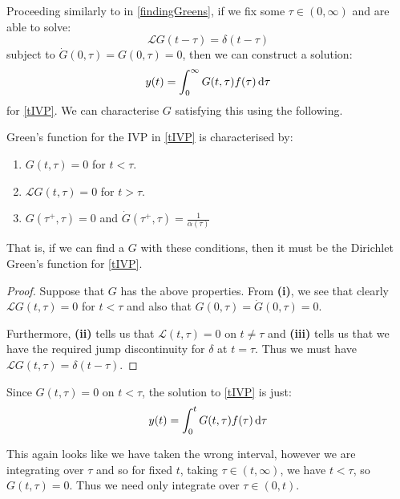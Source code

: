 \documentclass[../main.tex]{subfiles}
\begin{document}
Proceeding similarly to in \cref{findingGreens}, if we fix some $\tau \in (0, \infty)$ and are able to solve:
\[
  \mathcal{L}G(t - \tau) = \delta(t - \tau)
\]
subject to $\dot{G}(0, \tau) = G(0, \tau) = 0$, then we can construct a solution:
\[
  y(t) = \int_{0}^{\infty} G(t, \tau) f(\tau) \d{\tau}
\]
for \cref{tIVP}.
We can characterise $G$ satisfying this using the following.
\begin{proposition}
  Green's function for the IVP in \cref{tIVP} is characterised by:
  \begin{enumerate}
    \item $G(t, \tau) = 0$ for $t < \tau$.
    \item $\mathcal{L}G(t, \tau) = 0$ for $t > \tau$.
    \item $G(\tau^{+}, \tau) = 0$ and $\dot{G}(\tau^{+}, \tau) = \frac{1}{\alpha(\tau)}$
  \end{enumerate}
  That is, if we can find a $G$ with these conditions, then it must be the Dirichlet Green's function for \cref{tIVP}.
\end{proposition}
\begin{proof}
  Suppose that $G$ has the above properties.
  From \textbf{(i)}, we see that clearly $\mathcal{L} G(t, \tau) = 0$ for $t < \tau$ and also that $G(0, \tau) = \dot{G}(0, \tau) = 0$.

  Furthermore, \textbf{(ii)} tells us that $\mathcal{L}(t, \tau) = 0$ on $t \neq \tau$ and \textbf{(iii)} tells us that we have the required jump discontinuity for $\delta$ at $t = \tau$.
  Thus we must have $\mathcal{L}G(t, \tau) = \delta(t - \tau)$.
\end{proof}
Since $G(t, \tau) = 0$ on $t < \tau$, the solution to \cref{tIVP} is just:
\begin{equation}
  y(t) = \int_{0}^{t} G(t, \tau) f(\tau) \d{\tau} \label{tIVPGreen}
\end{equation}
\begin{remark}[Note]
  This again looks like we have taken the wrong interval, however we are integrating over $\tau$ and so for fixed $t$, taking $\tau \in (t, \infty)$, we have $t < \tau$, so $G(t, \tau) = 0$.
  Thus we need only integrate over $\tau \in (0, t)$.
\end{remark}
\end{document}
